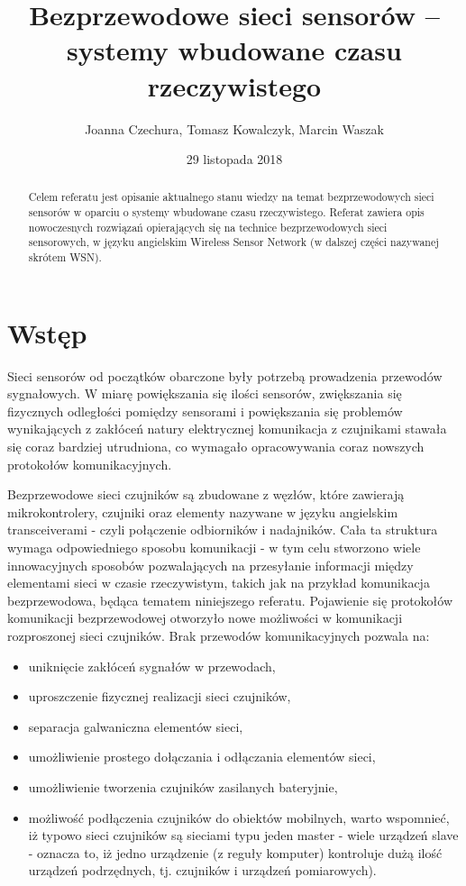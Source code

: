 \documentclass[12pt, twoside, hidelinks, a4paper]{article}
\begin{document}

\author{Joanna Czechura, Tomasz Kowalczyk, Marcin Waszak}
\title{Bezprzewodowe sieci sensorów – systemy wbudowane czasu rzeczywistego}
\date{29 listopada 2018}


\maketitle

\begin{abstract}
Celem referatu jest opisanie aktualnego stanu wiedzy na temat bezprzewodowych sieci sensorów w oparciu o systemy wbudowane czasu rzeczywistego. Referat zawiera opis nowoczesnych rozwiązań opierających się na technice bezprzewodowych sieci sensorowych, w języku angielskim Wireless Sensor Network (w dalszej części nazywanej skrótem WSN). 
\end{abstract}

\section{Wstęp}
Sieci sensorów od początków obarczone były potrzebą prowadzenia przewodów sygnałowych. W miarę powiększania się ilości sensorów, zwiększania się fizycznych odległości pomiędzy sensorami i powiększania się problemów wynikających z zakłóceń natury elektrycznej komunikacja z czujnikami stawała się coraz bardziej utrudniona, co wymagało opracowywania coraz nowszych protokołów komunikacyjnych. 

Bezprzewodowe sieci czujników są zbudowane z węzłów, które zawierają mikrokontrolery, czujniki oraz elementy nazywane w języku angielskim transceiverami - czyli połączenie odbiorników i nadajników\cite{c4}. Cała ta struktura wymaga odpowiedniego sposobu komunikacji - w tym celu stworzono wiele innowacyjnych sposobów pozwalających na   przesyłanie informacji między elementami sieci w czasie rzeczywistym, takich jak na przykład komunikacja bezprzewodowa, będąca tematem niniejszego referatu. Pojawienie się protokołów komunikacji bezprzewodowej otworzyło nowe możliwości w komunikacji rozproszonej sieci czujników. Brak przewodów komunikacyjnych pozwala na:
\begin{itemize}
\item uniknięcie zakłóceń sygnałów w przewodach,
\item uproszczenie fizycznej realizacji sieci czujników,
\item separacja galwaniczna elementów sieci,
\item umożliwienie prostego dołączania i odłączania elementów sieci,
\item umożliwienie tworzenia czujników zasilanych bateryjnie,
\item możliwość podłączenia czujników do obiektów mobilnych\cite{c1}, warto wspomnieć, iż typowo sieci czujników są sieciami typu jeden master - wiele urządzeń slave - oznacza to, iż jedno urządzenie (z reguły komputer) kontroluje dużą ilość urządzeń podrzędnych, tj. czujników i urządzeń pomiarowych).
\end{itemize}
\end{document}
